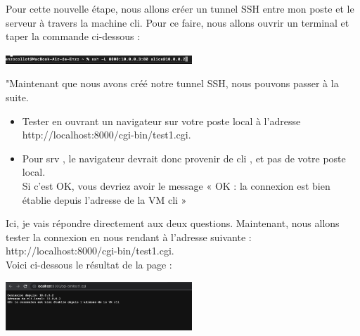 \documentclass[12pt]{article}
\begin{document}
\vspace{0.3cm}

Pour cette nouvelle étape, nous allons créer un tunnel SSH entre mon poste et le serveur à travers la machine cli. Pour ce faire, nous allons ouvrir un terminal et taper la commande ci-dessous :

\vspace{0.3cm}

\begin{center}
  \includegraphics[width=7cm]{Images-Client-SSH/Image-TD-SSH-5/port-local.png}
\end{center}

\vspace{0.3cm}

"Maintenant que nous avons créé notre tunnel SSH, nous pouvons passer à la suite.

\vspace{0.3cm}

\begin{itemize}
  \item Tester en ouvrant un navigateur sur votre poste local à l'adresse http://localhost:8000/cgi-bin/test1.cgi.
\end{itemize}

\vspace{0.3cm}

\begin{itemize}
  \item Pour srv , le navigateur devrait donc provenir de cli , et pas de votre poste local. \\
  Si c'est OK, vous devriez avoir le message « OK : la connexion est bien établie depuis l’adresse de la VM cli »
\end{itemize}

\vspace{0.3cm}

Ici, je vais répondre directement aux deux questions. Maintenant, nous allons tester la connexion en nous rendant à l'adresse suivante : http://localhost:8000/cgi-bin/test1.cgi. \\

Voici ci-dessous le résultat de la page :

\vspace{0.3cm}

\begin{center}
  \includegraphics[width=7cm]{Images-Client-SSH/Image-TD-SSH-5/Connexion-Cli.png}
\end{center}
\end{document}
